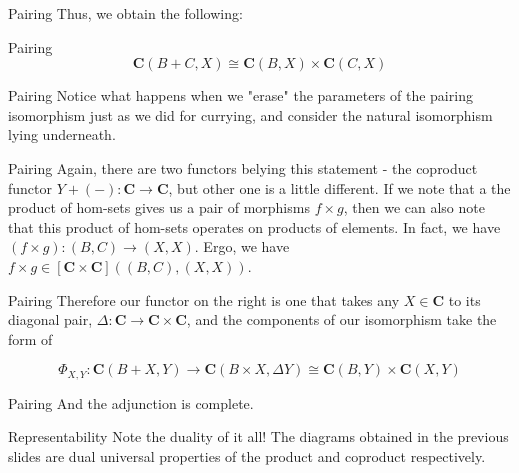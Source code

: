 \documentclass[tikz]{beamer}
\theoremstyle{definition}
\newcommand{\cat}[1]{\mathbf{#1}}
\begin{document}
\begin{frame}{Pairing}
Thus, we obtain the following:

\begin{block}{Pairing}
    \begin{equation*}
        \mathbf{C}(B + C, X) \cong \mathbf{C}(B, X) \times \mathbf{C}(C, X)
    \end{equation*}{}
\end{block}{}
\end{frame}

\begin{frame}{Pairing}
    Notice what happens when we "erase" the parameters of the pairing isomorphism just as we did for currying, and consider the natural isomorphism lying underneath.
\end{frame}

\begin{frame}{Pairing}
    Again, there are two functors belying this statement - the coproduct functor $Y + (-): \cat{C} \to \cat{C}$, but other one is a little different. If we note that a the product of hom-sets gives us a pair of morphisms $f \times g$, then we can also note that this product of hom-sets operates on products of elements. In fact, we have $(f \times g): (B, C) \to (X,X)$. Ergo, we have $f \times g \in \cat{[C \times C]}((B,C), (X,X))$.
\end{frame}

\begin{frame}{Pairing}
    Therefore our functor on the right is one that takes any $X \in \cat{C}$ to its diagonal pair, $\Delta: \cat{C} \to \cat{C} \times \cat{C}$, and the components of our isomorphism take the form of

    \begin{center}
    	\begin{equation*}
		\Phi_{X,Y} : \cat{C}(B + X, Y) \to \cat{C}(B \times X, \Delta Y) \cong \cat{C}(B, Y) \times \cat{C}(X, Y)
	\end{equation*}
    \end{center}
\end{frame}

\begin{frame}{Pairing}
    And the adjunction is complete.
\end{frame}

\begin{frame}{Representability}
    Note the duality of it all! The diagrams obtained in the previous slides are dual universal properties of the product and coproduct respectively.
\end{frame}
\end{document}
